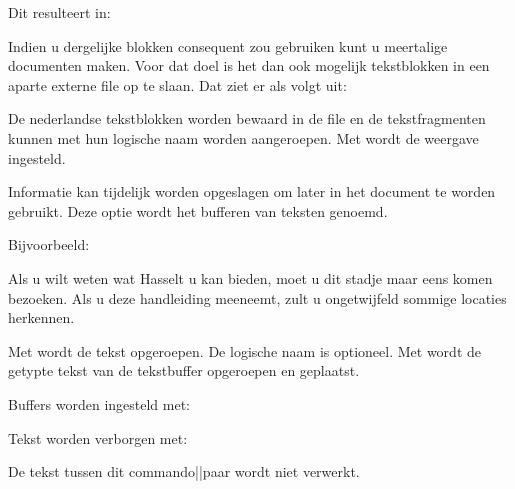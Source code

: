 Dit resulteert in:

\haalbuffer

Indien u dergelijke blokken consequent zou gebruiken kunt u
meertalige documenten maken. Voor dat doel is het dan ook
mogelijk tekstblokken in een aparte externe file op te slaan.
Dat ziet er als volgt uit:

\startbuffer
\stelblokin[nederlands][file=bewaar-n]
\stopbuffer

\typebuffer

De nederlandse tekstblokken worden bewaard in de file
 en de tekstfragmenten kunnen met hun
logische naam worden aangeroepen. Met \type{\stelblokin}
wordt de weergave ingesteld.




Informatie kan tijdelijk worden opgeslagen om later in het
document te worden gebruikt. Deze optie wordt het bufferen
van teksten genoemd.


Bijvoorbeeld:

\starttypen
\startbuffer[visite]
Als u wilt weten wat Hasselt u kan bieden, moet u dit stadje maar
eens komen bezoeken. Als u deze handleiding meeneemt, zult u
ongetwijfeld sommige locaties herkennen.
\stopbuffer

\haalbuffer[visite]
\stoptypen

Met \type{\haalbuffer[visite]} wordt de tekst opgeroepen. De
logische naam is optioneel. Met \type{\typebuffer[visite]}
wordt de getypte tekst van de tekstbuffer opgeroepen en
geplaatst.

Buffers worden ingesteld met:





Tekst worden verborgen met:


De tekst tussen dit commando||paar wordt niet verwerkt.



